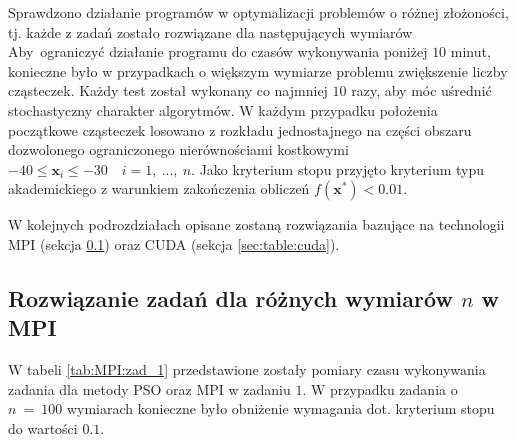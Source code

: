 \documentclass[11pt, a4paper, oneside]{article}
\newcommand{\vect}[1]{\bm{\mathbf{#1}}}
\begin{document}
Sprawdzono działanie programów w optymalizacji problemów o różnej złożoności, tj. każde z zadań zostało rozwiązane dla następujących wymiarów  Aby~ograniczyć działanie programu do czasów wykonywania poniżej $10$ minut, konieczne było w przypadkach o większym wymiarze problemu zwiększenie liczby cząsteczek. Każdy test został wykonany co najmniej $10$ razy, aby móc uśrednić stochastyczny charakter algorytmów. W każdym przypadku położenia początkowe cząsteczek losowano z rozkładu jednostajnego na części obszaru dozwolonego ograniczonego nierównościami kostkowymi $-40 \leq \vect{x}_i \leq -30 \quad i = 1, \ ..., \ n$. Jako kryterium stopu przyjęto kryterium typu akademickiego z warunkiem zakończenia obliczeń $f\left(\vect{x}^{*}\right) < 0.01$.

W kolejnych podrozdziałach opisane zostaną rozwiązania bazujące na technologii MPI (sekcja \ref{sec:table:mpi}) oraz CUDA (sekcja \ref{sec:table:cuda}).

\subsection{Rozwiązanie zadań dla różnych wymiarów $n$ w MPI} \label{sec:table:mpi}

W tabeli \ref{tab:MPI:zad_1} przedstawione zostały pomiary czasu wykonywania zadania dla metody PSO oraz MPI w zadaniu $1$. W przypadku zadania o $n \ = \ 100$ wymiarach konieczne było obniżenie wymagania dot. kryterium stopu do wartości $0.1$.
\end{document}
